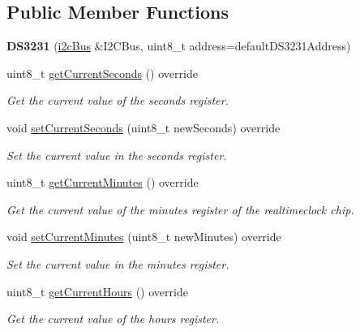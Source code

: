 \subsection*{Public Member Functions}
\begin{DoxyCompactItemize}
\item 
\mbox{\label{class_d_s3231_a316537e9a09ce7ef57c1955785f1fa24}} 
{\bfseries D\+S3231} (\mbox{\hyperlink{classi2c_bus}{i2c\+Bus}} \&I2\+C\+Bus, uint8\+\_\+t address=default\+D\+S3231\+Address)
\item 
uint8\+\_\+t \mbox{\hyperlink{class_d_s3231_a8a5357eae07991d94f8f7610a3f3073a}{get\+Current\+Seconds}} () override
\begin{DoxyCompactList}\small\item\em Get the current value of the seconds register. \end{DoxyCompactList}\item 
void \mbox{\hyperlink{class_d_s3231_ac73512cc6c2a37ffb21bee74ea835a09}{set\+Current\+Seconds}} (uint8\+\_\+t new\+Seconds) override
\begin{DoxyCompactList}\small\item\em Set the current value in the seconds register. \end{DoxyCompactList}\item 
uint8\+\_\+t \mbox{\hyperlink{class_d_s3231_a08f384e1897214d4a201aaaecde3b8a4}{get\+Current\+Minutes}} () override
\begin{DoxyCompactList}\small\item\em Get the current value of the minutes register of the realtimeclock chip. \end{DoxyCompactList}\item 
void \mbox{\hyperlink{class_d_s3231_a221f92091b813108b3515f6676be29c8}{set\+Current\+Minutes}} (uint8\+\_\+t new\+Minutes) override
\begin{DoxyCompactList}\small\item\em Set the current value in the minutes register. \end{DoxyCompactList}\item 
uint8\+\_\+t \mbox{\hyperlink{class_d_s3231_a019d8ed8074a02937c0777424be3d0ae}{get\+Current\+Hours}} () override
\begin{DoxyCompactList}\small\item\em Get the current value of the hours register. \end{DoxyCompactList}\item 

\end{DoxyCompactItemize}
